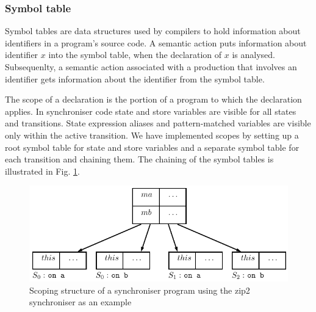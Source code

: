 


  \subsubsection{Symbol table}
Symbol tables are data structures used by compilers to hold information about identifiers in a program's source code. A semantic action puts information about identifier $x$ into the symbol table, when the declaration of $x$ is analysed. Subsequenlty, a semantic action associated with a production that involves an identifier gets information about the identifier from the symbol table.

The scope of a declaration is the portion of a program to which the declaration applies. In synchroniser code state and store variables are visible for all states and transitions. State expression aliases and pattern-matched variables are visible only within the active transition. We have implemented scopes by setting up a root symbol table for state and store variables and a separate symbol table for each transition and chaining them. The chaining of the symbol tables is illustrated in Fig. \ref{fig:symtab_chain}.

  \begin{figure}[h!]
  \centering
  \includegraphics{figs/chapter_02_symtab_chain.pdf}
  \caption{Scoping structure of a synchroniser program using the zip2 synchroniser as an example}
  \label{fig:symtab_chain}
  \end{figure}

